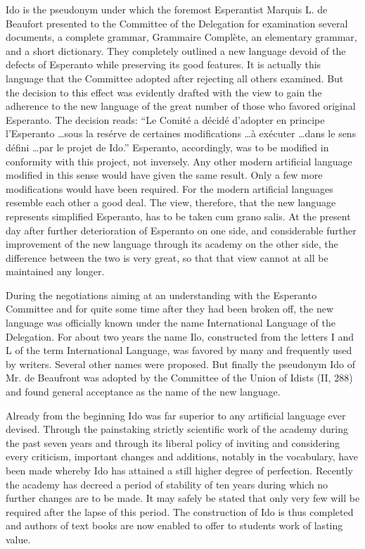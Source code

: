 Ido is the pseudonym under which the foremost Esperantist Marquis L. de Beaufort presented to the Committee of the Delegation for examination several documents, a complete grammar, Grammaire Complète, an elementary grammar, and a short dictionary. They completely outlined a new language devoid of the defects of Esperanto while preserving its good features. It is actually this language that the Committee adopted after rejecting all others examined. But the decision to this effect was evidently drafted with the view to gain the adherence to the new language of the great number of those who favored original Esperanto. The decision reads: “Le Comité a décidé d’adopter en principe l’Esperanto \ldots sous la resérve de certaines modifications \ldots à exécuter \ldots dans le sens défini \ldots par le projet de Ido.” Esperanto, accordingly, was to be modified in conformity with this project, not inversely. Any other modern artificial language modified in this sense would have given the same result. Only a few more modifications would have been required. For the modern artificial languages resemble each other a good deal. The view, therefore, that the new language represents simplified Esperanto, has to be taken cum grano salis. At the present day after further deterioration of Esperanto on one side, and considerable further improvement of the new language through its academy on the other side, the difference between the two is very great, so that that view cannot at all be maintained any longer. 

During the negotiations aiming at an understanding with the Esperanto Committee and for quite some time after they had been broken off, the new language was officially known under the name International Language of the Delegation. For about two years the name Ilo, constructed from the letters I and L of the term International Language, was favored by many and frequently used by writers. Several other names were proposed. But finally the pseudonym Ido of Mr. de Beaufront was adopted by the Committee of the Union of Idists (II, 288) and found general acceptance as the name of the new language. 

Already from the beginning Ido was far superior to any artificial language ever devised. Through the painstaking strictly scientific work of the academy during the past seven years and through its liberal policy of inviting and considering every criticism, important changes and additions, notably in the vocabulary, have been made whereby Ido has attained a still higher degree of perfection. Recently the academy has decreed a period of stability of ten years during which no further changes are to be made. It may safely be stated that only very few will be required after the lapse of this period. The construction of Ido is thus completed and authors of text books are now enabled to offer to students work of lasting value.

